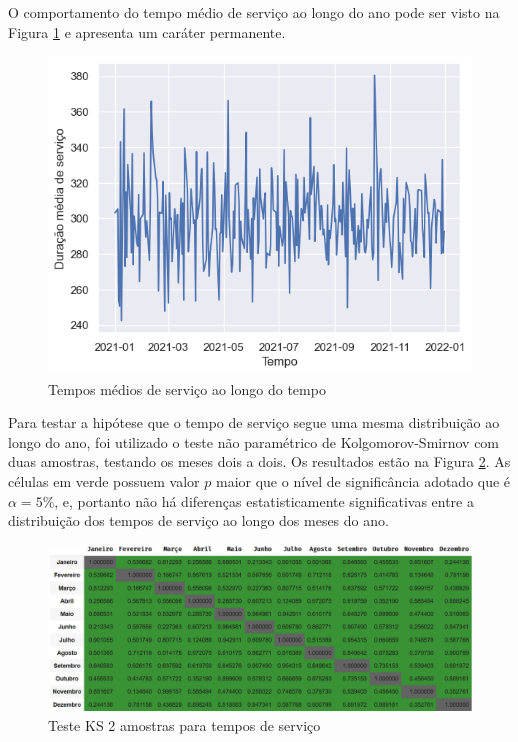 O comportamento do tempo médio de serviço ao longo do ano pode ser visto na Figura \ref*{fig: t_servico-tempo} e apresenta um caráter permanente.

\begin{figure}[ht]
    \includegraphics{analise-de-dados/anual/service_len.png}
    \caption{Tempos médios de serviço ao longo do tempo}
    \label{fig: t_servico-tempo}
\end{figure}

Para testar a hipótese que o tempo de serviço segue uma mesma distribuição ao longo do ano, foi utilizado o teste não paramétrico de Kolgomorov-Smirnov com duas amostras, testando os meses dois a dois. Os resultados estão na Figura \ref*{fig: KS_servico}. As células em verde possuem valor $p$ maior que o nível de significância adotado que é $\alpha = 5\%$, e, portanto não há diferenças estatisticamente significativas entre a distribuição dos tempos de serviço ao longo dos meses do ano.

\begin{figure}[ht]
    \includegraphics[scale=0.6]{analise-de-dados/anual/ks-service.png}
    \caption{Teste KS 2 amostras para tempos de serviço}
    \label{fig: KS_servico}
\end{figure}
